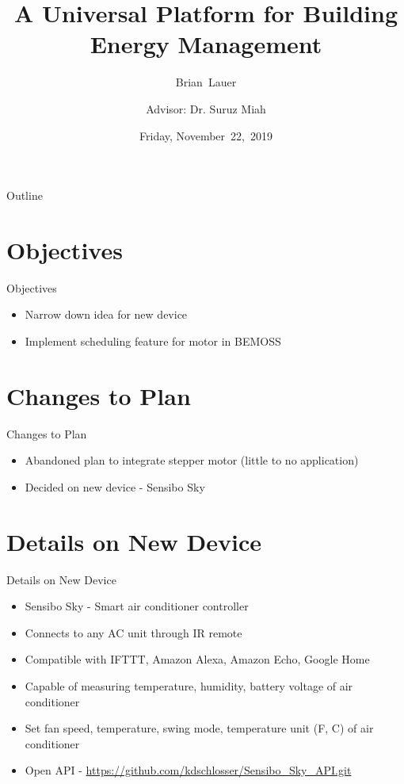 \documentclass{beamer}
\title[Proposal Pres]{A Universal Platform for Building Energy Management}
\author[B.~Lauer]{Brian~Lauer\\\and
Advisor: Dr. Suruz Miah}
\institute[Bradley University] %
{
  Department of Electrical and Computer Engineering\\
  Bradley University\\
  1501 W. Bradley Avenue\\
  Peoria, IL, 61625, USA
}
\date[November~22,~2019]{Friday, November~22,~2019}
\begin{document}
\begin{frame}
  \titlepage
\end{frame}

\begin{frame}{Outline}
  \tableofcontents
\end{frame}

\section{Objectives}
\begin{frame}{Objectives}
\begin{itemize}
\item Narrow down idea for new device
\item Implement scheduling feature for motor in BEMOSS
\end{itemize}
\end{frame}

\section{Changes to Plan}
\begin{frame}{Changes to Plan}
\begin{itemize}
\item Abandoned plan to integrate stepper motor (little to no application)
\item Decided on new device - Sensibo Sky
\end{itemize}
\end{frame}

\section{Details on New Device}
\begin{frame}{Details on New Device}
\begin{itemize}
\item Sensibo Sky - Smart air conditioner controller
\item Connects to any AC unit through IR remote
\item Compatible with IFTTT, Amazon Alexa, Amazon Echo, Google Home
\item Capable of measuring temperature, humidity, battery voltage of air conditioner
\item Set fan speed, temperature, swing mode, temperature unit (F, C) of air conditioner
\item Open API - \url{https://github.com/kdschlosser/Sensibo_Sky_API.git}
\end{itemize}
\end{frame}
\end{document}
